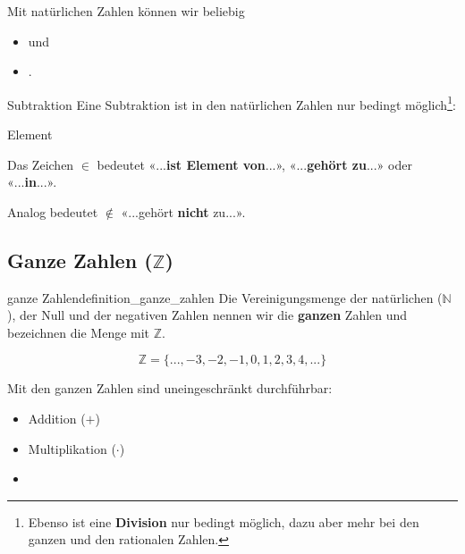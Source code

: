 Mit natürlichen Zahlen können wir beliebig
\begin{itemize}
\item {}  und
\item {}.
\end{itemize}

\begin{bemerkung}{Subtraktion}{}
  Eine Subtraktion ist in den natürlichen Zahlen nur bedingt
  möglich\footnote{Ebenso ist eine \textbf{Division} nur bedingt
    möglich, dazu aber mehr bei den ganzen und den rationalen Zahlen.}:
\end{bemerkung}

\begin{definition}{Element}{}
  
  Das Zeichen $\in$ bedeutet «...\textbf{ist Element von}...»,
  «...\textbf{gehört zu}...» oder «...\textbf{in}...».

  \vspace{5mm}
  
  Analog bedeutet $\not\in$ «...gehört \textbf{nicht} zu...».
\end{definition}

\newpage


\subsection{Ganze Zahlen ($\mathbb{Z}$)}


\begin{definition}{ganze Zahlen}{definition_ganze_zahlen}
Die Vereinigungsmenge der natürlichen ($\mathbb{N}$), der Null
und der negativen Zahlen nennen wir die \textbf{ganzen} Zahlen und
bezeichnen die Menge mit $\mathbb{Z}$.

$$\mathbb{Z} = \{..., -3, -2, -1, 0, 1, 2, 3,  4, ... \}$$

\end{definition}

Mit den ganzen Zahlen sind uneingeschränkt durchführbar:
\begin{itemize}
  \item Addition ($+$)
  \item Multiplikation ($\cdot$)
  \item {}
  \end{itemize}


